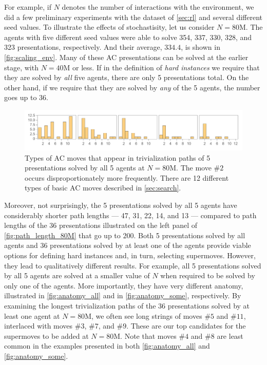 For example, if $N$ denotes the number of interactions with the environment, we did a few preliminary experiments with the dataset of \autoref{sec:rl} and several different seed values. To illustrate the effects of stochastisity, let us consider $N=80$M. The agents with five different seed values were able to solve 354, 337, 330, 328, and 323 presentations, respectively. And their average, $334.4$, is shown in \autoref{fig:scaling_env}. Many of these AC presentations can be solved at the earlier stage, with $N=40$M or less. If in the definition of \textit{hard instances} we require that they are solved by \textit{all} five agents, there are only 5 presentations total. On the other hand, if we require that they are solved by \textit{any} of the 5 agents, the number goes up to 36.

\begin{figure}[h]
    \centering
	\includegraphics[scale=0.6]{fig/anatomy_all.png}
	\caption{Types of AC moves that appear in trivialization paths of 5 presentations solved by all 5 agents at $N=80$M. The move $\# 2$ occurs disproportionately more frequently. There are 12 different types of basic AC moves described in \autoref{sec:search}.}
	\label{fig:anatomy_all}
\end{figure}

Moreover, not surprisingly, the 5 presentations solved by all 5 agents have considerably shorter path lengths --- 47, 31, 22, 14, and 13 --- compared to path lengths of the 36 presentations illustrated on the left panel of \autoref{fig:path_length_80M} that go up to $200$. Both 5 presentations solved by all agents and 36 presentations solved by at least one of the agents provide viable options for defining hard instances and, in turn, selecting supermoves. However, they lead to qualitatively different results. For example, all 5 presentations solved by all 5 agents are solved at a smaller value of $N$ when required to be solved by only one of the agents. More importantly, they have very different anatomy, illustrated in \autoref{fig:anatomy_all} and in \autoref{fig:anatomy_some}, respectively.
%
By examining the longest trivialization paths of the 36 presentations solved by at least one agent at $N=80$M, we often see long strings of moves $\# 5$ and $\# 11$, interlaced with moves $\# 3$, $\# 7$, and $\# 9$. These are our top candidates for the supermoves to be added at $N=80$M.
%
Note that moves $\# 4$ and $\# 8$ are least common in the examples presented in both \autoref{fig:anatomy_all} and \autoref{fig:anatomy_some}.

